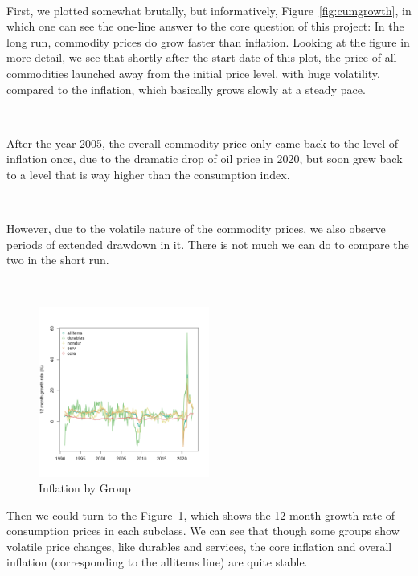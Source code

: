 \documentclass{article}
\begin{document}
\

First, we plotted somewhat brutally, but informatively, Figure~\ref{fig:cumgrowth}, in which one can see the one-line answer to the core question of this project: In the long run, commodity prices do grow faster than inflation. Looking at the figure in more detail, we see that shortly after the start date of this plot, the price of all commodities launched away from the initial price level, with huge volatility, compared to the inflation, which basically grows slowly at a steady pace. 

\

After the year 2005, the overall commodity price only came back to the level of inflation once, due to the dramatic drop of oil price in 2020, but soon grew back to a level that is way higher than the consumption index.

\

However, due to the volatile nature of the commodity prices, we also observe periods of extended drawdown in it. There is not much we can do to compare the two in the short run.

\
\begin{figure}[h!]
    \centering
    \includegraphics[width=0.5\textwidth]{../../figures/growth12.png}
    \caption{Inflation by Group}
    \label{fig:Inflation_by_group}
\end{figure}

Then we could turn to the Figure~\ref{fig:Inflation_by_group}, which shows the 12-month growth rate of consumption prices in each subclass. We can see that though some groups show volatile price changes, like durables and services, the core inflation and overall inflation (corresponding to the allitems line) are quite stable.
\end{document}
